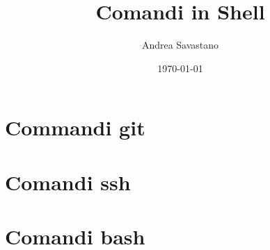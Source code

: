 \documentclass[12pt, a4paper]{article}
\title{Comandi in Shell}
\author{Andrea Savastano}
\date{\today}
\newcommand{\disablelinkcolor}{
	\hypersetup{linkcolor=black}
}
\begin{document}
	
	\maketitle
	\disablelinkcolor
	\tableofcontents
	\newpage
	
	\section{Commandi git}
	
	
	\newpage
	\section{Comandi ssh}
	
	
	\newpage
	\section{Comandi bash}
	
	
\end{document}
